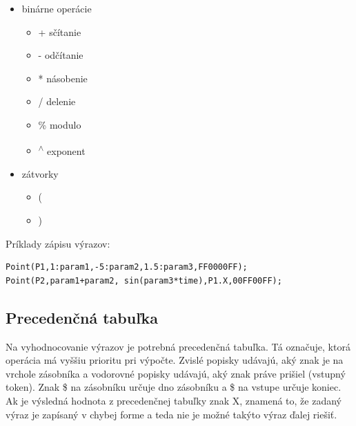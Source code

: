 \begin{itemize}
    \item  binárne operácie
        \begin{itemize}
            \item + sčítanie
            \item - odčítanie
            \item * násobenie
            \item / delenie
            \item \% modulo
            \item \textsuperscript{$\wedge$} exponent
         \end{itemize}
    \item  zátvorky
        \begin{itemize}
            \item  (
            \item  )
         \end{itemize}
 \end{itemize}
 
Príklady zápisu výrazov:


\lstset {language=C++}
\begin{lstlisting}
Point(P1,1:param1,-5:param2,1.5:param3,FF0000FF);
Point(P2,param1+param2, sin(param3*time),P1.X,00FF00FF); 
\end{lstlisting}


\subsection*{Precedenčná tabuľka}
Na vyhodnocovanie výrazov je potrebná precedenčná tabuľka. Tá označuje, ktorá operácia má vyššiu prioritu pri výpočte. Zvislé popisky udávajú, aký znak je na vrchole zásobníka a vodorovné popisky udávajú, aký znak práve prišiel (vstupný token). Znak \$ na zásobníku určuje dno zásobníku a \$ na vstupe určuje koniec. Ak je výsledná hodnota z precedenčnej tabuľky znak X, znamená to, že zadaný výraz je zapísaný v chybej forme a teda nie je možné takýto výraz ďalej riešiť.

